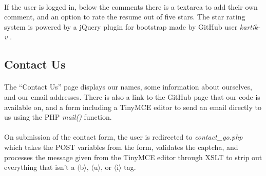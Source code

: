 \documentclass[11pt,letterpaper,titlepage]{article}
\begin{document}
        \paragraph{}
        If the user is logged in, below the comments there is a textarea to add
        their own comment, and an option to rate the resume out of five stars.
        The star rating system is powered by a jQuery plugin for bootstrap made
        by GitHub user \emph{kartik-v} \cite{stars}.

        \subsection{Contact Us}
        \paragraph{}
        The ``Contact Us'' page displays our names, some information about
        ourselves, and our email addresses. There is also a link to the GitHub
        page that our code is available on, and a form including a TinyMCE
        \cite{tinymce} editor to send an email directly to us using the PHP
        \emph{mail()} function.

        \paragraph{}
        On submission of the contact form, the user is redirected to
        \emph{contact\_go.php} which takes the POST variables from the form,
        validates the captcha, and processes the message given from the TinyMCE
        editor through XSLT to strip out everything that isn't a
        $\langle$b$\rangle$, $\langle$u$\rangle$, or $\langle$i$\rangle$
        tag.
\end{document}
